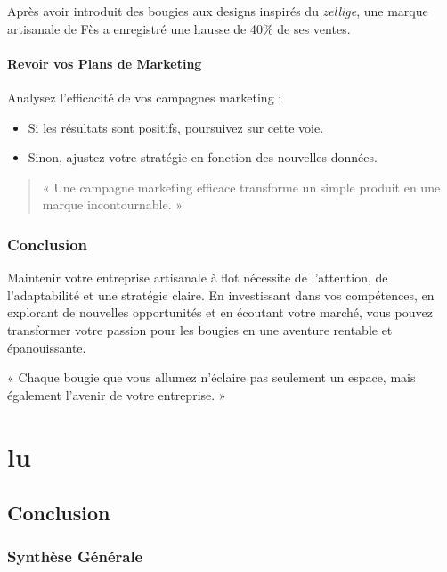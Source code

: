 \documentclass[11pt,fleqn,onecolumn,oneside]{book}
\begin{document}
\begin{example}
Après avoir introduit des bougies aux designs inspirés du \textit{zellige}, une marque artisanale de Fès a enregistré une hausse de 40\% de ses ventes.
\end{example}

\subsection*{Revoir vos Plans de Marketing}

Analysez l'efficacité de vos campagnes marketing :
\begin{itemize}
    \item Si les résultats sont positifs, poursuivez sur cette voie.
    \item Sinon, ajustez votre stratégie en fonction des nouvelles données.
\end{itemize}

\begin{quote}
« Une campagne marketing efficace transforme un simple produit en une marque incontournable. »
\end{quote}

\section{Conclusion}

Maintenir votre entreprise artisanale à flot nécessite de l’attention, de l’adaptabilité et une stratégie claire. En investissant dans vos compétences, en explorant de nouvelles opportunités et en écoutant votre marché, vous pouvez transformer votre passion pour les bougies en une aventure rentable et épanouissante.

\begin{corollary}
« Chaque bougie que vous allumez n’éclaire pas seulement un espace, mais également l’avenir de votre entreprise. » 
\end{corollary}

\part{lu}
\chapter*{Conclusion}

\section*{Synthèse Générale}
\end{document}
